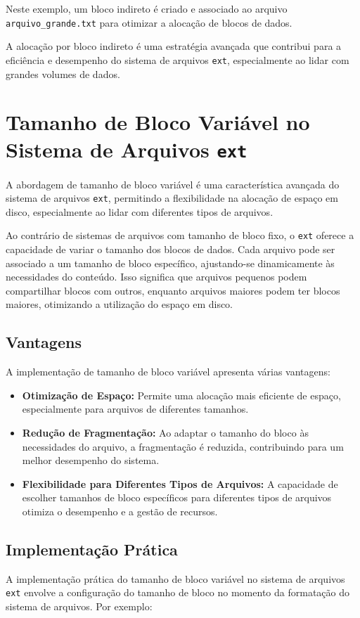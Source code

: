 \documentclass[
	12pt,				%
	openright,			%
	oneside,			%
	a4paper,			%
	chapter=TITLE,		%
	english,			%
	french,				%
	spanish,			%
	brazil				%
	]{abntex2}
\theoremstyle{definition}
\begin{document}
Neste exemplo, um bloco indireto é criado e associado ao arquivo \texttt{arquivo\_grande.txt} para otimizar a alocação de blocos de dados.

A alocação por bloco indireto é uma estratégia avançada que contribui para a eficiência e desempenho do sistema de arquivos \texttt{ext}, especialmente ao lidar com grandes volumes de dados.

\section{Tamanho de Bloco Variável no Sistema de Arquivos \texttt{ext}}
A abordagem de tamanho de bloco variável é uma característica avançada do sistema de arquivos \texttt{ext}, permitindo a flexibilidade na alocação de espaço em disco, especialmente ao lidar com diferentes tipos de arquivos.

Ao contrário de sistemas de arquivos com tamanho de bloco fixo, o \texttt{ext} oferece a capacidade de variar o tamanho dos blocos de dados. Cada arquivo pode ser associado a um tamanho de bloco específico, ajustando-se dinamicamente às necessidades do conteúdo. Isso significa que arquivos pequenos podem compartilhar blocos com outros, enquanto arquivos maiores podem ter blocos maiores, otimizando a utilização do espaço em disco.

\subsection{Vantagens}
A implementação de tamanho de bloco variável apresenta várias vantagens:

\begin{itemize}
    \item \textbf{Otimização de Espaço:} Permite uma alocação mais eficiente de espaço, especialmente para arquivos de diferentes tamanhos.
    
    \item \textbf{Redução de Fragmentação:} Ao adaptar o tamanho do bloco às necessidades do arquivo, a fragmentação é reduzida, contribuindo para um melhor desempenho do sistema.
    
    \item \textbf{Flexibilidade para Diferentes Tipos de Arquivos:} A capacidade de escolher tamanhos de bloco específicos para diferentes tipos de arquivos otimiza o desempenho e a gestão de recursos.
\end{itemize}

\subsection{Implementação Prática}
A implementação prática do tamanho de bloco variável no sistema de arquivos \texttt{ext} envolve a configuração do tamanho de bloco no momento da formatação do sistema de arquivos. Por exemplo:
\end{document}
